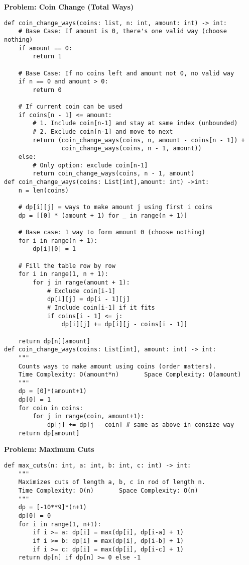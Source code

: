 \noindent\textbf{Problem: Coin Change (Total Ways)}
\begin{verbatim}
def coin_change_ways(coins: list, n: int, amount: int) -> int:
    # Base Case: If amount is 0, there's one valid way (choose nothing)
    if amount == 0:
        return 1

    # Base Case: If no coins left and amount not 0, no valid way
    if n == 0 and amount > 0:
        return 0

    # If current coin can be used
    if coins[n - 1] <= amount:
        # 1. Include coin[n-1] and stay at same index (unbounded)
        # 2. Exclude coin[n-1] and move to next
        return (coin_change_ways(coins, n, amount - coins[n - 1]) +
                coin_change_ways(coins, n - 1, amount))
    else:
        # Only option: exclude coin[n-1]
        return coin_change_ways(coins, n - 1, amount)
def coin_change_ways(coins: List[int],amount: int) ->int:
    n = len(coins)

    # dp[i][j] = ways to make amount j using first i coins
    dp = [[0] * (amount + 1) for _ in range(n + 1)]

    # Base case: 1 way to form amount 0 (choose nothing)
    for i in range(n + 1):
        dp[i][0] = 1

    # Fill the table row by row
    for i in range(1, n + 1):
        for j in range(amount + 1):
            # Exclude coin[i-1]
            dp[i][j] = dp[i - 1][j]
            # Include coin[i-1] if it fits
            if coins[i - 1] <= j:
                dp[i][j] += dp[i][j - coins[i - 1]]

    return dp[n][amount]
def coin_change_ways(coins: List[int], amount: int) -> int:
    """
    Counts ways to make amount using coins (order matters).
    Time Complexity: O(amount*n)       Space Complexity: O(amount)
    """
    dp = [0]*(amount+1)
    dp[0] = 1
    for coin in coins:
        for j in range(coin, amount+1):
            dp[j] += dp[j - coin] # same as above in consize way
    return dp[amount]
\end{verbatim}

\noindent\textbf{Problem: Maximum Cuts}
\begin{verbatim}
def max_cuts(n: int, a: int, b: int, c: int) -> int:
    """
    Maximizes cuts of length a, b, c in rod of length n.
    Time Complexity: O(n)       Space Complexity: O(n)
    """
    dp = [-10**9]*(n+1)
    dp[0] = 0
    for i in range(1, n+1):
        if i >= a: dp[i] = max(dp[i], dp[i-a] + 1)
        if i >= b: dp[i] = max(dp[i], dp[i-b] + 1)
        if i >= c: dp[i] = max(dp[i], dp[i-c] + 1)
    return dp[n] if dp[n] >= 0 else -1
\end{verbatim}

